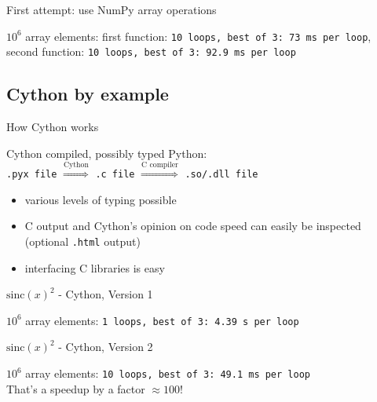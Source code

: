 \begin{frame}{First attempt: use NumPy array operations}



\pause
$10^{6}$ array elements: first function: {\texttt{10 loops, best of 3: 73 ms per loop}},
second function: {\texttt{10 loops, best of 3: 92.9 ms per loop}}

\end{frame}

\subsection{Cython by example}

\begin{frame}{How Cython works}

\begin{exbox}{Cython}
compiled, possibly typed Python:\\[1ex]
{\texttt{.pyx file}} $\stackrel{\text{Cython}}{\Longrightarrow}$ {\texttt{.c file}} $\stackrel{\text{C compiler}}{\Longrightarrow}$ {\texttt{.so/.dll file}}
\end{exbox}

\begin{itemize}
    \item various levels of typing possible
    \item C output and Cython's opinion on code speed can easily be
    inspected (optional {\texttt{.html}} output)
    \item interfacing C libraries is easy
\end{itemize}

\end{frame}

\begin{frame}[fragile]{$\mathrm{sinc}(x)^{2}$ - Cython, Version 1}



\pause
$10^{6}$ array elements: {\texttt{1 loops, best of 3: 4.39 s per loop}}
\end{frame}

\begin{frame}[fragile]{$\mathrm{sinc}(x)^{2}$ - Cython, Version 2}



\pause
$10^{6}$ array elements: {\texttt{10 loops, best of 3: 49.1 ms per loop}}\\[0.5ex]
That's a \alert{speedup by a factor $\approx 100$}!
\end{frame}

